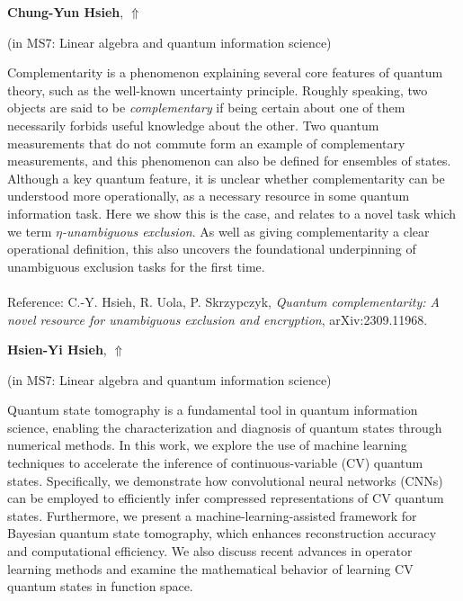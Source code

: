 \documentclass[ILAS2025-program.tex]{subfiles}
\begin{document}
\hypertarget{down0359}{}\begin{ilasabstract}
    
\textbf{Chung-Yun Hsieh},  \hfill \hyperlink{up0359}{$\Uparrow$}
    
    
(in {\color{mstitle}MS7: Linear algebra and quantum information science})
        
\mtskip
    Complementarity is a phenomenon explaining several core features of quantum theory, such as the well-known uncertainty principle. Roughly speaking, two objects are said to be {\em complementary} if being certain about one of them necessarily forbids useful knowledge about the other. Two quantum measurements that do not commute form an example of complementary measurements, and this phenomenon can also be defined for ensembles of states. Although a key quantum feature, it is unclear whether complementarity can be understood more operationally, as a necessary resource in some quantum information task. Here we show this is the case, and relates to a novel task which we term {\em $\eta$-unambiguous exclusion}. As well as giving complementarity a clear operational definition, this also uncovers the foundational underpinning of unambiguous exclusion tasks for the first time. \\\\
Reference: C.-Y. Hsieh, R. Uola, P. Skrzypczyk, {\em Quantum complementarity: A novel resource for unambiguous exclusion and encryption}, arXiv:2309.11968.

\end{ilasabstract}
    

\hypertarget{down0361}{}\begin{ilasabstract}
    
\textbf{Hsien-Yi Hsieh},  \hfill \hyperlink{up0361}{$\Uparrow$}
    
    
(in {\color{mstitle}MS7: Linear algebra and quantum information science})
        
\mtskip
    Quantum state tomography is a fundamental tool in quantum information science, enabling the characterization and diagnosis of quantum states through numerical methods. In this work, we explore the use of machine learning techniques to accelerate the inference of continuous-variable (CV) quantum states. Specifically, we demonstrate how convolutional neural networks (CNNs) can be employed to efficiently infer compressed representations of CV quantum states. Furthermore, we present a machine-learning-assisted framework for Bayesian quantum state tomography, which enhances reconstruction accuracy and computational efficiency. We also discuss recent advances in operator learning methods and examine the mathematical behavior of learning CV quantum states in function space.
\end{ilasabstract}
    
\end{document}
